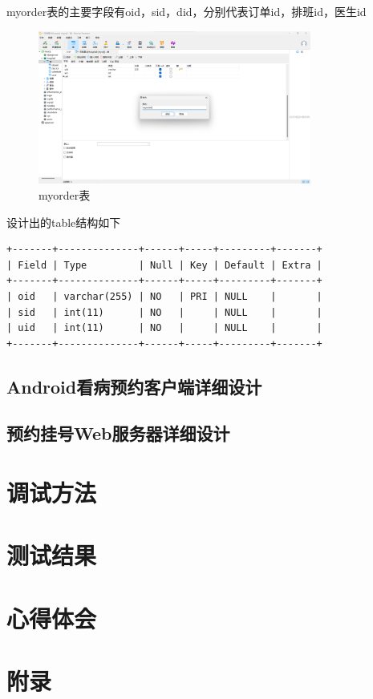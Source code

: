 \documentclass[UTF8,12pt]{article}
\begin{document}
myorder表的主要字段有oid，sid，did，分别代表订单id，排班id，医生id

\newpage

\begin{figure}[htbp]
    \centering
    \includegraphics[width=0.8\textwidth]{imgs/9.png}
    \caption{myorder表}
\end{figure}

设计出的table结构如下

\begin{lstlisting}[frame=shadowbox]
+-------+--------------+------+-----+---------+-------+
| Field | Type         | Null | Key | Default | Extra |
+-------+--------------+------+-----+---------+-------+
| oid   | varchar(255) | NO   | PRI | NULL    |       |
| sid   | int(11)      | NO   |     | NULL    |       |
| uid   | int(11)      | NO   |     | NULL    |       |
+-------+--------------+------+-----+---------+-------+
\end{lstlisting}

\newpage

\subsection{Android看病预约客户端详细设计}

\newpage

\subsection{预约挂号Web服务器详细设计}

\newpage

\section{调试方法}

\newpage

\section{测试结果}

\newpage

\section{心得体会}

\newpage

\section{附录}

\newpage
\end{document}
